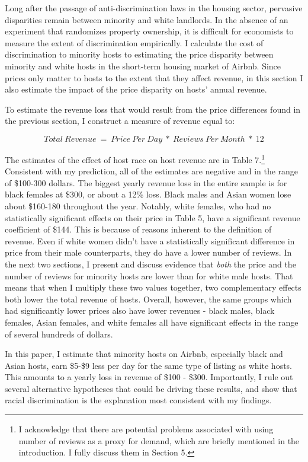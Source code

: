 
Long after the passage of anti-discrimination laws in the housing sector, pervasive disparities remain between minority and white landlords. In the absence of an experiment that randomizes property ownership, it is difficult for economists to measure the extent of discrimination empirically. I calculate the cost of discrimination to minority hosts to estimating the price disparity between minority and white hosts in the short-term housing market of Airbnb. Since prices only matter to hosts to the extent that they affect revenue, in this section I also estimate the impact of the price disparity on hosts' annual revenue.

To estimate the revenue loss that would result from the price differences found in the previous section, I construct a measure of revenue equal to: 

\[Total \: Revenue \ = \ Price \: Per \: Day \ * \ Reviews \: Per \: Month \ * \ 12\] 

The estimates of the effect of host race on host revenue are in Table 7.\footnote{I acknowledge that there are potential problems associated with using number of reviews as a proxy for demand, which are briefly mentioned in the introduction. I fully discuss them in Section 5.} Consistent with my prediction, all of the estimates are negative and in the range of \$100-300 dollars. The biggest yearly revenue loss in the entire sample is for black females at \$300, or about a 12\% loss. Black males and Asian women lose about \$160-180 throughout the year. Notably, white females, who had no statistically significant effects on their price in Table 5, have a significant revenue coefficient of \$144. This is because of reasons inherent to the definition of revenue. Even if white women didn't have a statistically significant difference in price from their male counterparts, they do have a lower number of reviews. In the next two sections, I present and discuss evidence that \textit{both} the price and the number of reviews for minority hosts are lower than for white male hosts. That means that when I multiply these two values together, two complementary effects both lower the total revenue of hosts. Overall, however, the same groups which had significantly lower prices also have lower revenues - black males, black females, Asian females, and white females all have significant effects in the range of several hundreds of dollars. 


In this paper, I estimate that minority hosts on Airbnb, especially black and Asian hosts, earn \$5-\$9 less per day for the same type of listing as white hosts. This amounts to a yearly loss in revenue of \$100 - \$300. Importantly, I rule out several alternative hypotheses that could be driving these results, and show that racial discrimination is the explanation most consistent with my findings. 


